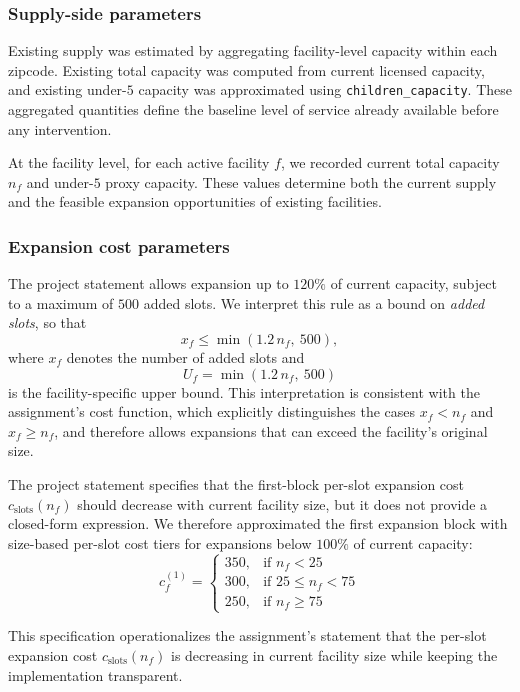 \documentclass[11pt]{article}
\newcommand{\1}{\mathbb{I}}
\begin{document}
\subsubsection{Supply-side parameters}

Existing supply was estimated by aggregating facility-level capacity within each zipcode. Existing total capacity was computed from current licensed capacity, and existing under-\(5\) capacity was approximated using \texttt{children\_capacity}. These aggregated quantities define the baseline level of service already available before any intervention.

At the facility level, for each active facility \(f\), we recorded current total capacity \(n_f\) and under-\(5\) proxy capacity. These values determine both the current supply and the feasible expansion opportunities of existing facilities.

\subsubsection{Expansion cost parameters}

The project statement allows expansion up to \(120\%\) of current capacity, subject to a maximum of \(500\) added slots. We interpret this rule as a bound on \emph{added slots}, so that
\[
x_f \le \min(1.2\,n_f,\ 500),
\]
where \(x_f\) denotes the number of added slots and
\[
U_f = \min(1.2\,n_f,\ 500)
\]
is the facility-specific upper bound. This interpretation is consistent with the assignment’s cost function, which explicitly distinguishes the cases \(x_f < n_f\) and \(x_f \ge n_f\), and therefore allows expansions that can exceed the facility’s original size. 

The project statement specifies that the first-block per-slot expansion cost \(c_{\text{slots}}(n_f)\) should decrease with current facility size, but it does not provide a closed-form expression. We therefore approximated the first expansion block with size-based per-slot cost tiers for expansions below \(100\%\) of current capacity:
\[
c_f^{(1)} =
\begin{cases}
350, & \text{if } n_f < 25\\
300, & \text{if } 25 \le n_f < 75\\
250, & \text{if } n_f \ge 75
\end{cases}
\]

This specification operationalizes the assignment's statement that the per-slot expansion cost \(c_{\text{slots}}(n_f)\) is decreasing in current facility size while keeping the implementation transparent.
\end{document}
